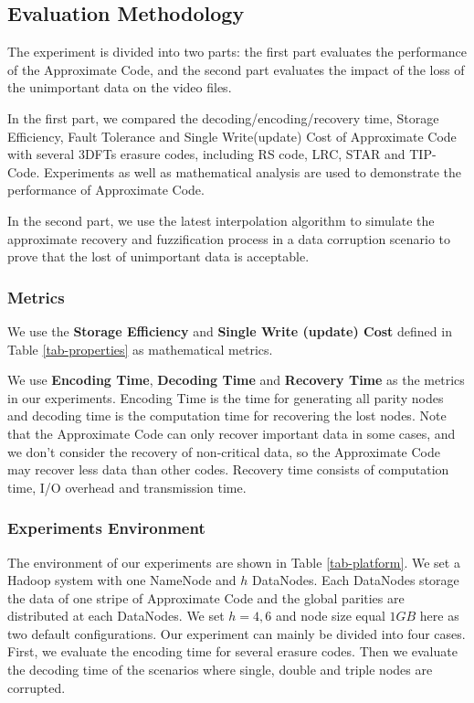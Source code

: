 \documentclass[sigconf]{acmart}
\begin{document}
\subsection{Evaluation Methodology}
The experiment is divided into two parts: the first part evaluates the performance of the Approximate Code, and the second part evaluates the impact of the loss of the unimportant data on the video files.

In the first part, we compared the decoding/encoding/recovery time, Storage Efficiency, Fault Tolerance and Single Write(update) Cost of Approximate Code with several 3DFTs erasure codes, including RS code, LRC, STAR and TIP-Code. Experiments as well as mathematical analysis are used to demonstrate the performance of Approximate Code.

In the second part, we use the latest interpolation algorithm to simulate the approximate recovery and fuzzification process in a data corruption scenario to prove that the lost of unimportant data is acceptable.

\subsubsection{Metrics}
We use the \textbf{Storage Efficiency} and \textbf{Single Write (update) Cost} defined in Table \ref{tab-properties} as mathematical metrics.

We use \textbf{Encoding Time}, \textbf{Decoding Time} and \textbf{Recovery Time} as the metrics in our experiments. Encoding Time is the time for generating all parity nodes and decoding time is the computation time for recovering the lost nodes. Note that the Approximate Code can only recover important data in some cases, and we don't consider the recovery of non-critical data, so the Approximate Code may recover less data than other codes. Recovery time consists of computation time, I/O overhead and transmission time.
\subsubsection{Experiments Environment}
The environment of our experiments are shown in Table \ref{tab-platform}. We set a Hadoop system with one NameNode and $h$ DataNodes. Each DataNodes storage the data of one stripe of Approximate Code and the global parities are distributed at each DataNodes. We set $h=4,6$ and node size equal $1GB$ here as two default configurations. Our experiment can mainly be divided into four cases. First, we evaluate the encoding time for several erasure codes. Then we evaluate the decoding time of the scenarios where single, double and triple nodes are corrupted.
\end{document}
